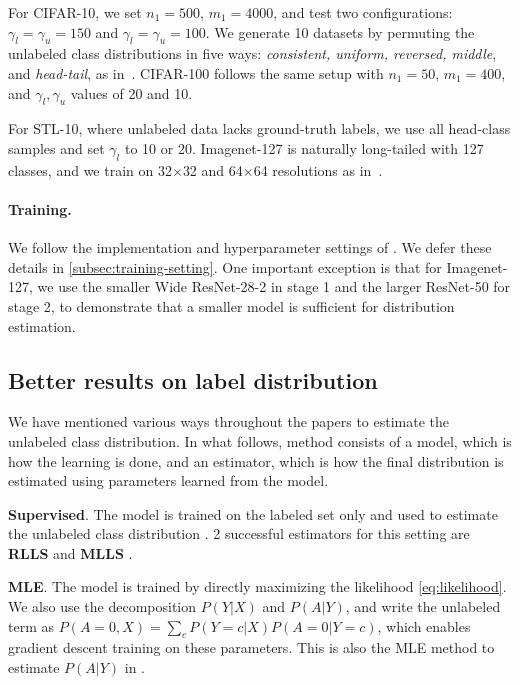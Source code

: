 For CIFAR-10, we set $n_1 = 500$, $m_1 = 4000$, and test two configurations: $\gamma_l = \gamma_u = 150$ and $\gamma_l = \gamma_u = 100$. We generate 10 datasets by permuting the unlabeled class distributions in five ways: \textit{consistent, uniform, reversed, middle}, and \textit{head-tail}, as in~\cite{simpro}. CIFAR-100 follows the same setup with $n_1 = 50$, $m_1 = 400$, and $\gamma_l, \gamma_u$ values of 20 and 10.  

For STL-10, where unlabeled data lacks ground-truth labels, we use all head-class samples and set $\gamma_l$ to 10 or 20. Imagenet-127 is naturally long-tailed with 127 classes, and we train on 32$\times$32 and 64$\times$64 resolutions as in~\cite{cossl}.


\paragraph{Training.} We follow the implementation and hyperparameter settings of \cite{simpro}. We defer these details in \cref{subsec:training-setting}. One important exception is that for Imagenet-127, we use the smaller Wide ResNet-28-2 in stage 1 and the larger ResNet-50 for stage 2, to demonstrate that a smaller model is sufficient for distribution estimation.






\subsection{Better results on label distribution} 
\label{subsec:label}
We have mentioned various ways throughout the papers to estimate the unlabeled class distribution. In what follows, method consists of a model, which is how the learning is done, and an estimator, which is how the final distribution is estimated using parameters learned from the model.

\noindent
\textbf{Supervised}. The model is trained on the labeled set only and used to estimate the unlabeled class distribution \cite{unifiedlabelshift}. 2 successful estimators for this setting are \textbf{RLLS} \cite{rlls} and \textbf{MLLS} \cite{mlls}. 

\noindent\textbf{MLE}. The model is trained by directly maximizing the likelihood \cref{eq:likelihood}. We also use the decomposition $P(Y|X)$ and $P(A|Y)$, and write the unlabeled term as $P(A=0, X) = \sum_{c} P(Y=c|X) P(A=0|Y=c)$, which enables gradient descent training on these parameters. This is also the MLE method to estimate $P(A|Y)$ in \cite{arelabelsinformative}.

